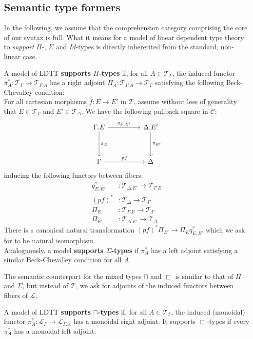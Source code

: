 \subsection{Semantic type formers}
In the following, we assume that the comprehension category comprising the core of our syntax is full.
What it means for a model of linear dependent type theory to \textit{support} $\Pi$-, $\Sigma$ and $Id$-types is directly inhererited from the standard, non-linear case.
\begin{defn}A model of LDTT \textbf{supports $\Pi$-types} if, for all $A \in \mathcal{T}_{\Gamma}$, the induced functor $\pi_A^* : \mathcal{T}_{\Gamma} \to \mathcal{T}_{\Gamma.A}$ has a right adjoint $\Pi_A : \mathcal{T}_{\Gamma.A} \to \mathcal{T}_{\Gamma}$ satisfying the following Beck-Chevalley condition:\\
  For all cartesian morphisms $f : E \to E'$ in $\mathcal{T}$, assume without loss of generality that $E \in \mathcal{T}_{\Gamma}$ and $E' \in \mathcal{T}_{\Delta}$. We have the following pullback square in $\mathcal{C}$:
  \[
    \ti
    \Gamma.E \ar[d, "\pi_E"] \ar[r, "q_{E, E'}"] & \Delta.E' \ar[d, "\pi_{E'}"] \\
    \Gamma \ar[r, "pf"] & \Delta
    \kz
  \]
inducing the following functors between fibers:
  \[
    \begin{split}
      q^*_{E, E'} &: \mathcal{T}_{\Delta.E'} \to \mathcal{T}_{\Gamma.E}\\
      (pf)^* &: \mathcal{T}_{\Delta} \to \mathcal{T}_{\Gamma}\\
      \Pi_E &: \mathcal{T}_{\Gamma.E} \to \mathcal{T}_{\Gamma}\\
      \Pi_{E'} &: \mathcal{T}_{\Delta.E'} \to \mathcal{T}_{\Delta}
    \end{split}    
  \]
  There is a canonical natural transformation $(pf)^*\Pi_{E'} \to \Pi_{E}q^*_{E, E'}$ which we ask for to be natural isomorphism.\\
Analoguously, a model \textbf{supports $\Sigma$-types} if $\pi_A^*$ has a left adjoint satisfying a similar Beck-Chevalley condition for all $A$.
\end{defn}
The semantic counterpart for the mixed types $\sqcap$ and $\sqsubset$ is similar to that of $\Pi$ and $\Sigma$, but instead of $\mathcal{T}$, we ask for adjoints of the induced functors between fibers of $\mathcal{L}$.
\begin{defn}
A model of LDTT \textbf{supports $\sqcap$-types} if, for all $A \in \mathcal{T}_{\Gamma}$, the induced (monoidal) functor $\pi_A^* : \mathcal{L}_{\Gamma} \to \mathcal{L}_{\Gamma.A}$ has a monoidal right adjoint.
It supports $\sqsubset$-types if every $\pi_A^*$ has a monoidal left adjoint.
\end{defn}
